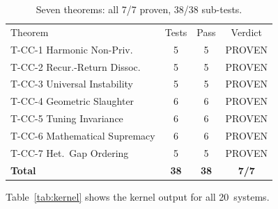 \documentclass[
  aps,
  prd,
  twocolumn,
  superscriptaddress,
  nofootinbib,
  floatfix
]{revtex4-2}
\begin{document}
\begin{table}[h]
\caption{Seven theorems: all 7/7 proven, 38/38 sub-tests.}
\label{tab:summary}
\begin{ruledtabular}
\begin{tabular}{lccc}
\textrm{Theorem} & \textrm{Tests} & \textrm{Pass} & \textrm{Verdict} \\
\colrule
T-CC-1 Harmonic Non-Priv.       & 5  & 5  & PROVEN \\
T-CC-2 Recur.-Return Dissoc.    & 5  & 5  & PROVEN \\
T-CC-3 Universal Instability     & 5  & 5  & PROVEN \\
T-CC-4 Geometric Slaughter       & 6  & 6  & PROVEN \\
T-CC-5 Tuning Invariance         & 6  & 6  & PROVEN \\
T-CC-6 Mathematical Supremacy    & 6  & 6  & PROVEN \\
T-CC-7 Het.\ Gap Ordering        & 5  & 5  & PROVEN \\
\colrule
\textbf{Total} & \textbf{38} & \textbf{38} & \textbf{7/7} \\
\end{tabular}
\end{ruledtabular}
\end{table}

Table~\ref{tab:kernel} shows the kernel output for all 20~systems.
\end{document}
